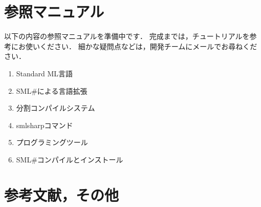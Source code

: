 \documentclass{jbook}
\newcommand{\smlsharp}{SML\#}
\begin{document}
% 
% 
% 
	


\part{参照マニュアル}
\label{part:referenceManual}

	以下の内容の参照マニュアルを準備中です．
	完成までは，チュートリアルを参考にお使いください．
	細かな疑問点などは，開発チームにメールでお尋ねください．
\begin{enumerate}
\item 
Standard ML言語
\item 
\smlsharp{}による言語拡張
\item 
分割コンパイルシステム
\item 
smlsharpコマンド
\item 
プログラミングツール
\item 
\smlsharp{}コンパイルとインストール
\end{enumerate}
	

\part{参考文献，その他}
\label{part:bib}
\end{document}
